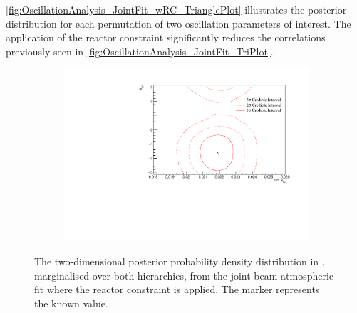 \autoref{fig:OscillationAnalysis_JointFit_wRC_TrianglePlot} illustrates the posterior distribution for each permutation of two oscillation parameters of interest. The application of the reactor constraint significantly reduces the correlations previously seen in \autoref{fig:OscillationAnalysis_JointFit_TriPlot}.

\begin{figure}[h]
  \begin{subfigure}[t]{0.96\textwidth}
    \includegraphics[width=\textwidth, trim={0mm 0mm 0mm 0mm}, clip,page=1]{Figures/OA/JointFit_wRC/Contours_2D_th13_dcp_BH_1_wRC_UnSmeared_CredibleInterval.pdf}
  \end{subfigure}
  \caption{The two-dimensional posterior probability density distribution in , marginalised over both hierarchies, from the joint beam-atmospheric fit where the reactor constraint is applied. The marker represents the known value.}
  \label{fig:OscillationAnalysis_JointFit_wRC_TH13DCP}
\end{figure}

